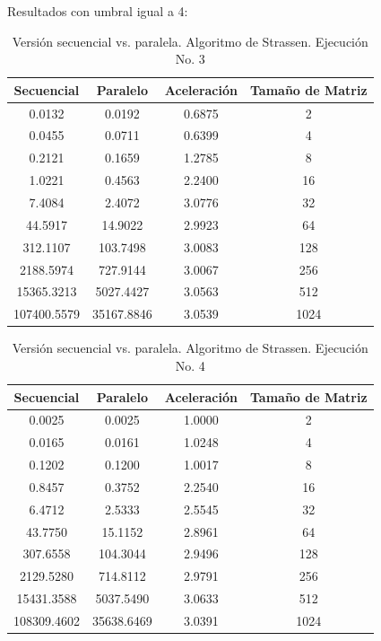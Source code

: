 \documentclass{article}
\begin{document}
Resultados con umbral igual a 4:

\begin{table}[ht]
\centering
\begin{tabular}{|c|c|c|c|}
\hline
\textbf{Secuencial} & \textbf{Paralelo} & \textbf{Aceleración} & \textbf{Tamaño de Matriz} \\
\hline
0.0132 & 0.0192 & 0.6875 & 2 \\
0.0455 & 0.0711 & 0.6399 & 4 \\
0.2121 & 0.1659 & 1.2785 & 8 \\
1.0221 & 0.4563 & 2.2400 & 16 \\
7.4084 & 2.4072 & 3.0776 & 32 \\
44.5917 & 14.9022 & 2.9923 & 64 \\
312.1107 & 103.7498 & 3.0083 & 128 \\
2188.5974 & 727.9144 & 3.0067 & 256 \\
15365.3213 & 5027.4427 & 3.0563 & 512 \\
107400.5579 & 35167.8846 & 3.0539 & 1024 \\
\hline
\end{tabular}
\caption{Versión secuencial vs. paralela. Algoritmo de Strassen. Ejecución No. 3}
\end{table}

\begin{table}[ht]
\centering
\begin{tabular}{|c|c|c|c|}
\hline
\textbf{Secuencial} & \textbf{Paralelo} & \textbf{Aceleración} & \textbf{Tamaño de Matriz} \\
\hline
0.0025 & 0.0025 & 1.0000 & 2 \\
0.0165 & 0.0161 & 1.0248 & 4 \\
0.1202 & 0.1200 & 1.0017 & 8 \\
0.8457 & 0.3752 & 2.2540 & 16 \\
6.4712 & 2.5333 & 2.5545 & 32 \\
43.7750 & 15.1152 & 2.8961 & 64 \\
307.6558 & 104.3044 & 2.9496 & 128 \\
2129.5280 & 714.8112 & 2.9791 & 256 \\
15431.3588 & 5037.5490 & 3.0633 & 512 \\
108309.4602 & 35638.6469 & 3.0391 & 1024 \\
\hline
\end{tabular}
\caption{Versión secuencial vs. paralela. Algoritmo de Strassen. Ejecución No. 4}
\end{table}
\end{document}
